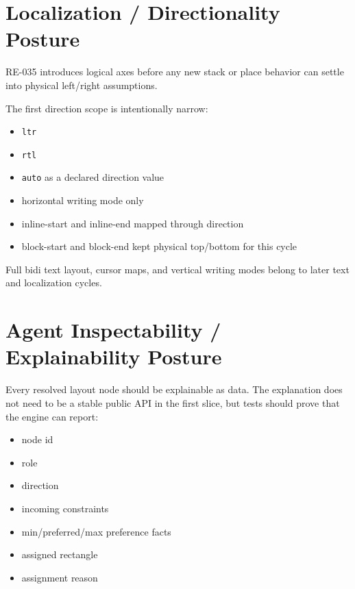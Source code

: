 \section{Localization / Directionality Posture}\label{record-163-localization-directionality-posture}

RE-035 introduces logical axes before any new stack or place behavior can settle into physical left/right assumptions.

The first direction scope is intentionally narrow:

\begin{itemize}
\tightlist
\item
  \texttt{l\allowbreak{}t\allowbreak{}r}
\item
  \texttt{r\allowbreak{}t\allowbreak{}l}
\item
  \texttt{a\allowbreak{}u\allowbreak{}t\allowbreak{}o} as a declared direction value
\item
  horizontal writing mode only
\item
  inline-start and inline-end mapped through direction
\item
  block-start and block-end kept physical top/bottom for this cycle
\end{itemize}

Full bidi text layout, cursor maps, and vertical writing modes belong to later text and localization cycles.

\section{Agent Inspectability / Explainability Posture}\label{record-163-agent-inspectability-explainability-posture}

Every resolved layout node should be explainable as data. The explanation does not need to be a stable public API in the first slice, but tests should prove that the engine can report:

\begin{itemize}
\tightlist
\item
  node id
\item
  role
\item
  direction
\item
  incoming constraints
\item
  min/preferred/max preference facts
\item
  assigned rectangle
\item
  assignment reason
\end{itemize}


